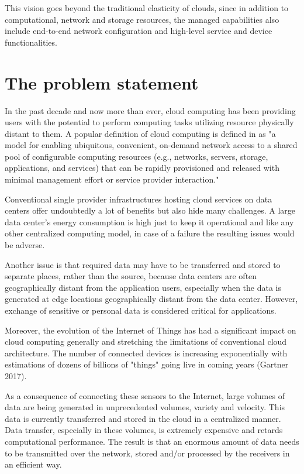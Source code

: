 \documentclass{ieeeaccess}
\begin{document}
This vision goes beyond the traditional elasticity of clouds, since in addition to computational, network and storage resources, the managed capabilities also include end-to-end network configuration and high-level service and device functionalities.

\section{The problem statement}
\label{sec:challenges}

In the past decade and now more than ever, cloud computing has been providing users with the potential to perform computing tasks utilizing resource physically distant to them. A popular definition of cloud computing is defined in \cite{cloud-def} as "a model for enabling ubiquitous, convenient, on-demand network access to a shared pool of configurable computing resources (e.g., networks, servers, storage, applications, and services) that can be rapidly provisioned and released with minimal management effort or service provider interaction."

Conventional single provider infrastructures hosting cloud services on data centers offer undoubtedly a lot of benefits but also hide many challenges. A large data center’s energy consumption is high just to keep it operational and like any other centralized computing model, in case of a failure the resulting issues would be adverse.

Another issue is that required data may have to be transferred and stored to separate places, rather than the source, because data centers are often geographically distant from the application users, especially when the data is generated at edge locations geographically distant from the data center. However, exchange of sensitive or personal data is considered critical for applications.

Moreover, the evolution of the Internet of Things has had a significant impact on cloud computing generally and stretching the limitations of conventional cloud architecture. The number of connected devices is increasing exponentially with estimations of dozens of billions of "things" going live in coming years (Gartner 2017).

As a consequence of connecting these sensors to the Internet, large volumes of data are being generated in unprecedented volumes, variety and velocity. This data is currently transferred and stored in the cloud in a centralized manner. Data transfer, especially in these volumes, is extremely expensive and retards computational performance. The result is that an enormous amount of data needs to be transmitted over the network, stored and/or processed by the receivers in an efficient way.
\end{document}
